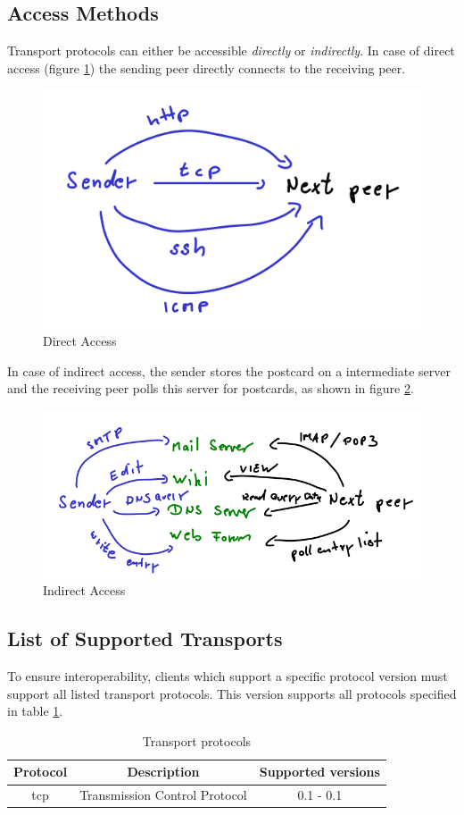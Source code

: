 \subsection{Access Methods}
\label{accessmethods}
Transport protocols can either be accessible \textit{directly} or 
\textit{indirectly}. In case of direct access (figure \ref{directaccess})
the sending peer directly connects to the receiving peer.
\begin{figure}
    \centering
    \caption{Direct Access}
    \label{directaccess}
    \includegraphics[scale=0.8]{directaccess.png}
\end{figure}
In case of indirect access, the sender stores the postcard on a intermediate
server and the receiving peer polls this server for postcards, as shown
in figure \ref{indirectaccess}.
\begin{figure}
    \centering
    \caption{Indirect Access}
    \label{indirectaccess}
    \includegraphics[scale=0.8]{indirectaccess.png}
\end{figure}
\subsection{List of Supported Transports}
To ensure interoperability, clients which support a specific
protocol version must support all listed transport protocols. This version
supports all protocols specified in table \ref{transportprotocollisting}.
\begin{longtable}{|c|c|c|}
\caption{Transport protocols}
\label{transportprotocollisting}
\\
\hline
\textbf{Protocol} & \textbf{Description} & \textbf{Supported versions}\\
\hline
tcp & Transmission Control Protocol & 0.1 - 0.1\\
\hline
\end{longtable}
